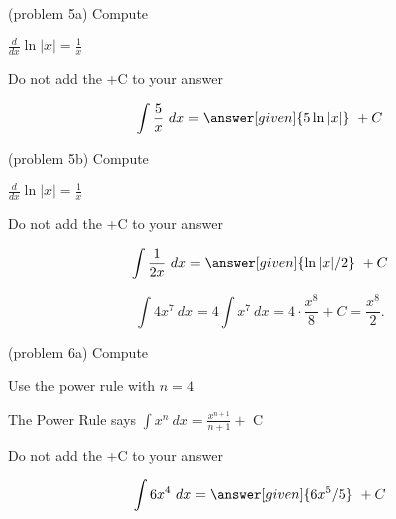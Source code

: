 \documentclass{ximera}
\begin{document}
\begin{problem}(problem 5a)
Compute

\begin{hint}
$\frac{d}{dx} \ln|x| = \frac{1}{x}$
\end{hint}
\begin{hint}
\begin{center}
Do not add the +C to your answer
\end{center}
\end{hint}

\[
\int \frac{5}{x} \ dx =
\answer[given]{5\ln|x|} \ +  C
\]
\end{problem}

\begin{problem}(problem 5b)
Compute

\begin{hint}
$\frac{d}{dx} \ln|x| = \frac{1}{x}$
\end{hint}
\begin{hint}
\begin{center}
Do not add the +C to your answer
\end{center}
\end{hint}

\[
\int \frac{1}{2x} \ dx =
\answer[given]{\ln|x| /2} \ +  C
\]
\end{problem}


\begin{example}[example 6]
\[
\int 4x^7 \ dx = 4 \int x^7 \ dx = 4\cdot \frac{x^8}{8} +C 
= \frac{x^8}{2}.
\]
\end{example}


\begin{problem}(problem 6a)
Compute 

\begin{hint}
Use the power rule with $n=4$
\end{hint}
\begin{hint}
The Power Rule says $\int x^n \ dx = \frac{x^{n+1}}{n+1} +$ C
\end{hint}
\begin{hint}
\begin{center}
Do not add the +C to your answer
\end{center}
\end{hint}

\[
\int 6x^4 \ dx =
\answer[given]{6x^5 /5} \ + C
\]
\end{problem}
\end{document}

